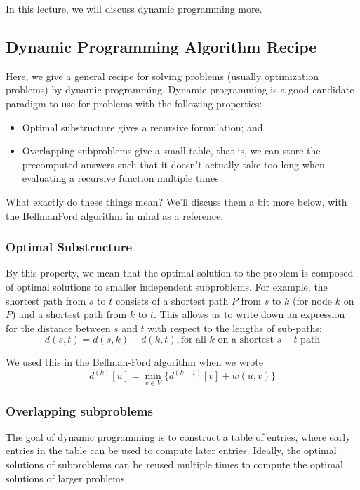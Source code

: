 \documentclass [12pt]{article}
\theoremstyle{definition}
\begin{document}
In this lecture, we will discuss dynamic programming more.

\subsection{Dynamic Programming Algorithm Recipe}
Here, we give a general recipe for solving problems (usually optimization problems) by dynamic programming. Dynamic programming is a good candidate paradigm to use for problems with the following properties:

\begin{itemize}
  \item Optimal substructure gives a recursive formulation; and
  \item Overlapping subproblems give a small table, that is, we can store the precomputed
answers such that it doesn't actually take too long when evaluating a recursive function multiple times.
\end{itemize}

What exactly do these things mean? We'll discuss them a bit more below, with the BellmanFord algorithm in mind as a reference.

\subsubsection{Optimal Substructure} 

By this property, we mean that the optimal solution to the problem is composed of optimal solutions to smaller independent subproblems. For example, the shortest path from $s$ to $t$ consists of a shortest path $P$ from $s$ to $k$ (for node $k$ on $P$) and a shortest path from $k$ to $t$. This allows us to write down an expression for the distance between $s$ and $t$ with respect to the lengths of sub-paths: 
$$
d(s, t) = d(s, k) + d(k, t), \text{for all } k \text{ on a shortest } s - t \text{ path}
$$

We used this in the Bellman-Ford algorithm when we wrote 
$$
d^{(k)} [u] = \min_{v\in V} \{d^{(k-1)}[v ] + w(u, v )\}
$$

\subsubsection{Overlapping subproblems}
 
The goal of dynamic programming is to construct a table of entries, where early entries in the table can be used to compute later entries. Ideally, the optimal solutions of subproblems can be reused multiple times to compute the optimal solutions of larger problems. 
\end{document}
